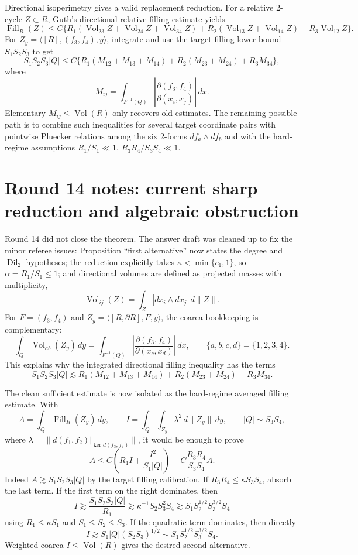 \documentclass[12pt]{article}
\newcommand{\Dil}{\operatorname{Dil}}
\newcommand{\Vol}{\operatorname{Vol}}
\newcommand{\Fill}{\operatorname{Fill}}
\begin{document}
Directional isoperimetry gives a valid replacement reduction.  For a relative
2-cycle \(Z\subset R\), Guth's directional relative filling estimate yields
\[
 \Fill_R(Z)\le C\{R_1(\Vol_{23}Z+\Vol_{24}Z+\Vol_{34}Z)
      +R_2(\Vol_{13}Z+\Vol_{14}Z)+R_3\Vol_{12}Z\}.
\]
For \(Z_y=\langle [R],(f_3,f_4),y\rangle\), integrate and use the target filling
lower bound \(S_1S_2S_3\) to get
\[
 S_1S_2S_3|Q|
 \le C\{R_1(M_{12}+M_{13}+M_{14})
      +R_2(M_{23}+M_{24})+R_3M_{34}\},
\]
where
\[
 M_{ij}=\int_{F^{-1}(Q)}
        \left|\frac{\partial(f_3,f_4)}{\partial(x_i,x_j)}\right|\,dx .
\]
Elementary \(M_{ij}\le \Vol(R)\) only recovers old estimates.  The remaining
possible path is to combine such inequalities for several target coordinate pairs
with pointwise Pluecker relations among the six 2-forms \(df_a\wedge df_b\) and
with the hard-regime assumptions \(R_1/S_1\ll1\), \(R_3R_4/S_3S_4\ll1\).



\section*{Round 14 notes: current sharp reduction and algebraic obstruction}

Round 14 did not close the theorem.  The answer draft was cleaned up to fix the
minor referee issues: Proposition ``first alternative'' now states the degree and
\(\Dil_2\) hypotheses; the reduction explicitly takes
\(\kappa<\min\{c_1,1\}\), so \(\alpha=R_1/S_1\le1\); and directional volumes are
defined as projected masses with multiplicity,
\[
  \Vol_{ij}(Z)=\int_Z |dx_i\wedge dx_j|\,d\|Z\|.
\]
For \(F=(f_3,f_4)\) and \(Z_y=\langle[R,\partial R],F,y\rangle\), the coarea
bookkeeping is complementary:
\[
 \int_Q\Vol_{ab}(Z_y)\,dy
 =\int_{F^{-1}(Q)}
 \left|\frac{\partial(f_3,f_4)}{\partial(x_c,x_d)}\right|\,dx,
 \qquad \{a,b,c,d\}=\{1,2,3,4\}.
\]
This explains why the integrated directional filling inequality has the terms
\[
 S_1S_2S_3|Q|\lesssim
 R_1(M_{12}+M_{13}+M_{14})+R_2(M_{23}+M_{24})+R_3M_{34}.
\]

The clean sufficient estimate is now isolated as the hard-regime averaged filling
estimate.  With
\[
 A=\int_Q\Fill_R(Z_y)\,dy,\qquad
 I=\int_Q\int_{Z_y}\lambda^2\,d\|Z_y\|\,dy,\qquad |Q|\sim S_3S_4,
\]
where \(\lambda=\|d(f_1,f_2)|_{\ker d(f_3,f_4)}\|\), it would be enough to prove
\[
 A\le C\left(R_1I+\frac{I^2}{S_1|Q|}\right)
      +C\frac{R_3R_4}{S_3S_4}A. \tag{HAF}
\]
Indeed \(A\gtrsim S_1S_2S_3|Q|\) by the target filling calibration.  If
\(R_3R_4\le \kappa S_3S_4\), absorb the last term.  If the first term on the
right dominates, then
\[
 I\gtrsim \frac{S_1S_2S_3|Q|}{R_1}
 \gtrsim \kappa^{-1} S_2S_3^2S_4
 \gtrsim S_1S_2^{1/2}S_3^{3/2}S_4
\]
using \(R_1\le\kappa S_1\) and \(S_1\le S_2\le S_3\).  If the quadratic term
dominates, then directly
\[
 I\gtrsim S_1|Q|(S_2S_3)^{1/2}
 \sim S_1S_2^{1/2}S_3^{3/2}S_4.
\]
Weighted coarea \(I\le \Vol(R)\) gives the desired second alternative.
\end{document}

